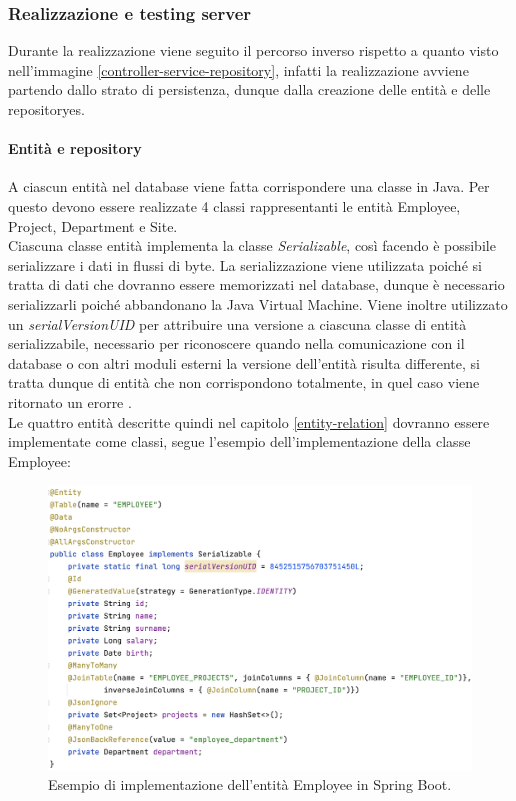 \subsubsection*{Realizzazione e testing server}
Durante la realizzazione viene seguito il percorso inverso rispetto a quanto visto nell'immagine \ref{controller-service-repository}, infatti la realizzazione avviene partendo dallo strato di persistenza, dunque dalla creazione delle entità e delle repositoryes.
\paragraph{Entità e repository}
A ciascun entità nel database viene fatta corrispondere una classe in Java. Per questo devono essere realizzate 4 classi rappresentanti le entità Employee, Project, Department e Site.\\
Ciascuna classe entità implementa la classe \textit{Serializable}, così facendo è possibile serializzare i dati in flussi di byte. La serializzazione viene utilizzata poiché si tratta di dati che dovranno essere memorizzati nel database, dunque è necessario serializzarli poiché abbandonano la Java Virtual Machine. Viene inoltre utilizzato un \textit{serialVersionUID} per attribuire una versione a ciascuna classe di entità serializzabile, necessario per riconoscere quando nella comunicazione con il database o con altri moduli esterni la versione dell'entità risulta differente, si tratta dunque di entità che non corrispondono totalmente, in quel caso viene ritornato un erorre .\\
Le quattro entità descritte quindi nel capitolo \ref{entity-relation} dovranno essere implementate come classi, segue l'esempio dell'implementazione della classe Employee:
\FloatBarrier
\begin{figure}[!ht]
\centering
\includegraphics[width=0.9\linewidth]{immagini/employee_entity.png}
\caption{Esempio di implementazione dell'entità Employee in Spring Boot.}
\label{employee-entity-definition}
\end{figure}
